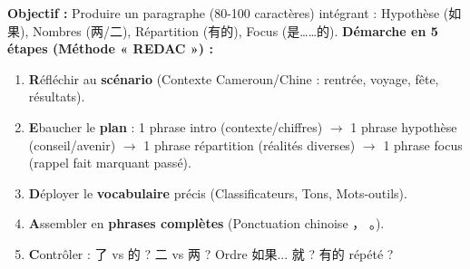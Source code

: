 \documentclass[11pt]{article}
\newcommand{\cle}[1]{{\popxbold\color{popdark}#1}}
\begin{document}
\begin{methode}
\textbf{Objectif :} Produire un paragraphe (80-100 caractères) intégrant : Hypothèse (\cle{如果}), Nombres (\cle{两}/\cle{二}), Répartition (\cle{有的}), Focus (\cle{是……的}).
\textbf{Démarche en 5 étapes (Méthode « REDAC ») :}
\begin{enumerate}
    \item \textbf{R}éfléchir au \textbf{scénario} (Contexte Cameroun/Chine : rentrée, voyage, fête, résultats).
    \item \textbf{E}baucher le \textbf{plan} : 1 phrase intro (contexte/chiffres) $\rightarrow$ 1 phrase hypothèse (conseil/avenir) $\rightarrow$ 1 phrase répartition (réalités diverses) $\rightarrow$ 1 phrase focus (rappel fait marquant passé).
    \item \textbf{D}éployer le \textbf{vocabulaire} précis (Classificateurs, Tons, Mots-outils).
    \item \textbf{A}ssembler en \textbf{phrases complètes} (Ponctuation chinoise ， 。).
    \item \textbf{C}ontrôler : \cle{了} vs \cle{的} ? \cle{二} vs \cle{两} ? Ordre \cle{如果}... \cle{就} ? \cle{有的} répété ?
\end{enumerate}
\end{methode}
\end{document}
